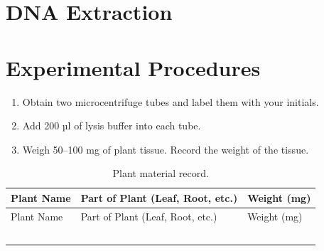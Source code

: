 \documentclass[]{book}
\providecommand{\tightlist}{%
  \setlength{\itemsep}{0pt}\setlength{\parskip}{0pt}}
\theoremstyle{definition}
\theoremstyle{definition}
\theoremstyle{definition}
\theoremstyle{remark}
\begin{document}
\section{DNA Extraction}\label{dna-extraction}

\section{Experimental Procedures}\label{experimental-procedures-8}

\begin{enumerate}
\def\labelenumi{\arabic{enumi}.}
\tightlist
\item
  Obtain two microcentrifuge tubes and label them with your initials.
\item
  Add 200 µl of lysis buffer into each tube.
\item
  Weigh 50--100 mg of plant tissue. Record the weight of the tissue.
\end{enumerate}

\begin{longtable}[]{@{}lll@{}}
\caption{\label{tab:plant} Plant material record.}\tabularnewline
\toprule
Plant Name & Part of Plant (Leaf, Root, etc.) & Weight
(mg)\tabularnewline
\midrule
\endfirsthead
\toprule
Plant Name & Part of Plant (Leaf, Root, etc.) & Weight
(mg)\tabularnewline
\midrule
\endhead
& &\tabularnewline
& &\tabularnewline
& &\tabularnewline
& &\tabularnewline
& &\tabularnewline
\bottomrule
\end{longtable}
\end{document}
